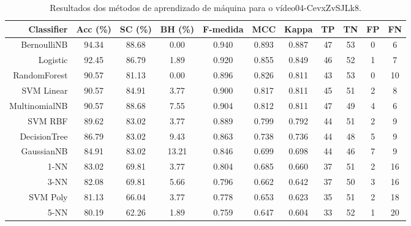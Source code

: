 \begin{table}[!htb]
\centering
\caption{Resultados dos métodos de aprendizado de máquina para o vídeo04-CevxZvSJLk8.}
\label{tab:04-CevxZvSJLk8}
\begin{tabular}{r|c|c|c|c|c|c|c|c|c|c}
\hline\hline
Classifier & Acc (\%) & SC (\%) & BH (\%) & F-medida & MCC & Kappa & TP & TN & FP & FN \\ \hline
BernoulliNB & 94.34 & 88.68 & 0.00 & 0.940 & 0.893 & 0.887 & 47 & 53 & 0 & 6 \\ 
Logistic & 92.45 & 86.79 & 1.89 & 0.920 & 0.855 & 0.849 & 46 & 52 & 1 & 7 \\ 
RandomForest & 90.57 & 81.13 & 0.00 & 0.896 & 0.826 & 0.811 & 43 & 53 & 0 & 10 \\ 
SVM Linear & 90.57 & 84.91 & 3.77 & 0.900 & 0.817 & 0.811 & 45 & 51 & 2 & 8 \\ 
MultinomialNB & 90.57 & 88.68 & 7.55 & 0.904 & 0.812 & 0.811 & 47 & 49 & 4 & 6 \\ 
SVM RBF & 89.62 & 83.02 & 3.77 & 0.889 & 0.799 & 0.792 & 44 & 51 & 2 & 9 \\ 
DecisionTree & 86.79 & 83.02 & 9.43 & 0.863 & 0.738 & 0.736 & 44 & 48 & 5 & 9 \\ 
GaussianNB & 84.91 & 83.02 & 13.21 & 0.846 & 0.699 & 0.698 & 44 & 46 & 7 & 9 \\ 
1-NN & 83.02 & 69.81 & 3.77 & 0.804 & 0.685 & 0.660 & 37 & 51 & 2 & 16 \\ 
3-NN & 82.08 & 69.81 & 5.66 & 0.796 & 0.662 & 0.642 & 37 & 50 & 3 & 16 \\ 
SVM Poly & 81.13 & 66.04 & 3.77 & 0.778 & 0.653 & 0.623 & 35 & 51 & 2 & 18 \\ 
5-NN & 80.19 & 62.26 & 1.89 & 0.759 & 0.647 & 0.604 & 33 & 52 & 1 & 20 \\ 
\hline\hline
\end{tabular}
\end{table}
